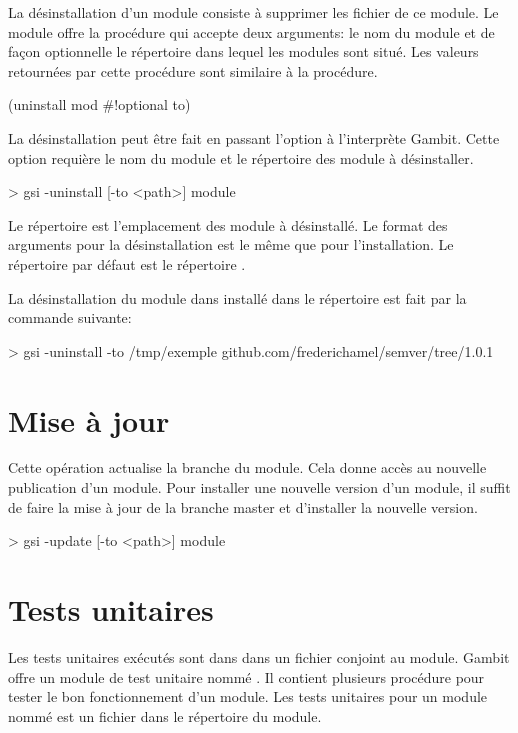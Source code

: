 La désinstallation d'un module consiste à supprimer les fichier
de ce module. Le module  offre la procédure
 qui accepte deux arguments: le nom du module
et de façon optionnelle le répertoire dans lequel les modules
sont situé. Les valeurs retournées par cette procédure sont
similaire à la procédure.
\begin{center}
  \begin{mplisting}{0.4}
(uninstall mod #!optional to)
\end{mplisting}
\end{center}
La désinstallation peut être fait en passant l'option 
à l'interprète Gambit. Cette option requière le nom du module et le
répertoire  des module à désinstaller.
\begin{center}
  \begin{mplisting}{0.8}
> gsi -uninstall [-to <path>] module
\end{mplisting}
\end{center}
Le répertoire  est l'emplacement des module
à désinstallé. Le format des arguments pour la désinstallation
est le même que pour l'installation. Le répertoire par défaut
est le répertoire .

La désinstallation du module  dans installé dans le
répertoire  est fait par la commande suivante:
\begin{center}
  \begin{mplisting}{1}
> gsi -uninstall -to /tmp/exemple github.com/frederichamel/semver/tree/1.0.1
\end{mplisting}
\end{center}


\section{Mise à jour}
Cette opération actualise la branche  du module.
Cela donne accès au nouvelle publication d'un module. Pour installer
une nouvelle version d'un module, il suffit de faire la mise à jour
de la branche master et d'installer la nouvelle version.

\begin{center}
  \begin{mplisting}{0.8}
> gsi -update [-to <path>] module
\end{mplisting}
\end{center}

\section{Tests unitaires}
Les tests unitaires exécutés sont dans dans un fichier conjoint au module.
Gambit offre un module de test unitaire nommé . Il
contient plusieurs procédure pour tester le bon fonctionnement d'un module.
Les tests unitaires pour un module nommé  est un fichier
 dans le répertoire du module.

